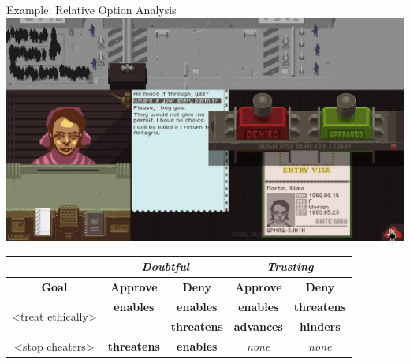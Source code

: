 \documentclass[xcolor=x11names]{beamer}
\begin{document}
\begin{frame}{Example: Relative Option Analysis}
  \centering
  \includegraphics[height=0.3\textheight]{res/papersplease-large.png} \\
  \vspace*{1em}
  \footnotesize
  \begin{tabular}{c c c c c}
    \toprule
    &  \multicolumn{2}{c}{\textit{Doubtful}} & \multicolumn{2}{c}{\textit{Trusting}} \\
    \midrule
    \textbf{Goal} & \textbf{Approve} & \textbf{Deny} & \textbf{Approve} & \textbf{Deny} \\
    \midrule
    \multirow{2}{*}{<treat ethically>} & \textbf{enables}  & \textbf{enables}   & \textbf{enables}  & \textbf{threatens} \\
                                       &                   & \textbf{threatens} & \textbf{advances} & \textbf{hinders}   \\
    \midrule

    <stop cheaters> & \textbf{threatens} & \textbf{enables} & \emph{none} & \emph{none} \\
    \bottomrule
  \end{tabular}
\end{frame}
\end{document}
